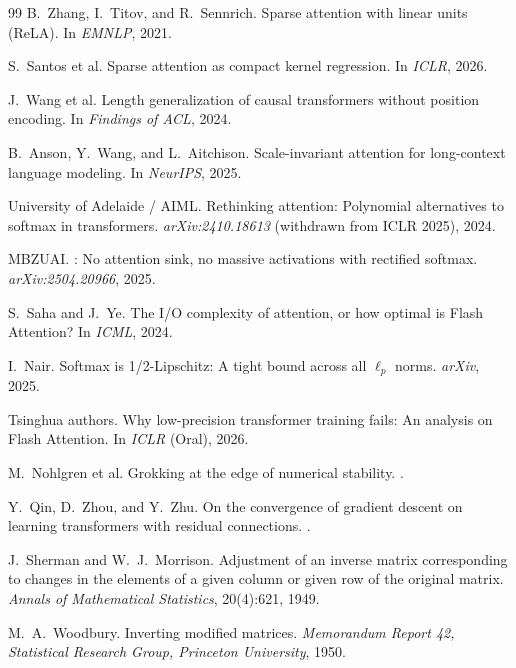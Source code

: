 \documentclass[11pt,a4paper]{article}
\theoremstyle{remark}
\begin{document}
\begin{thebibliography}{99}
B.~Zhang, I.~Titov, and R.~Sennrich.
\newblock Sparse attention with linear units ({ReLA}).
\newblock In \emph{EMNLP}, 2021.

S.~Santos et al.
\newblock Sparse attention as compact kernel regression.
\newblock In \emph{ICLR}, 2026.

J.~Wang et al.
\newblock Length generalization of causal transformers without position encoding.
\newblock In \emph{Findings of ACL}, 2024.

B.~Anson, Y.~Wang, and L.~Aitchison.
\newblock Scale-invariant attention for long-context language modeling.
\newblock In \emph{NeurIPS}, 2025.

University of Adelaide / AIML.
\newblock Rethinking attention: Polynomial alternatives to softmax in transformers.
\newblock \emph{arXiv:2410.18613} (withdrawn from ICLR 2025), 2024.

MBZUAI.
: No attention sink, no massive activations with rectified softmax.
\newblock \emph{arXiv:2504.20966}, 2025.

S.~Saha and J.~Ye.
\newblock The {I/O} complexity of attention, or how optimal is {Flash Attention}?
\newblock In \emph{ICML}, 2024.

I.~Nair.
\newblock Softmax is 1/2-{Lipschitz}: A tight bound across all $\ell_p$ norms.
\newblock \emph{arXiv}, 2025.

Tsinghua authors.
\newblock Why low-precision transformer training fails: An analysis on {Flash Attention}.
\newblock In \emph{ICLR} (Oral), 2026.

M.~Nohlgren et al.
\newblock Grokking at the edge of numerical stability.
.

Y.~Qin, D.~Zhou, and Y.~Zhu.
\newblock On the convergence of gradient descent on learning transformers with residual connections.
.

J.~Sherman and W.~J.~Morrison.
\newblock Adjustment of an inverse matrix corresponding to changes in the elements of a given column or given row of the original matrix.
\newblock \emph{Annals of Mathematical Statistics}, 20(4):621, 1949.

M.~A.~Woodbury.
\newblock Inverting modified matrices.
\newblock \emph{Memorandum Report 42, Statistical Research Group, Princeton University}, 1950.


\end{thebibliography}
\end{document}
